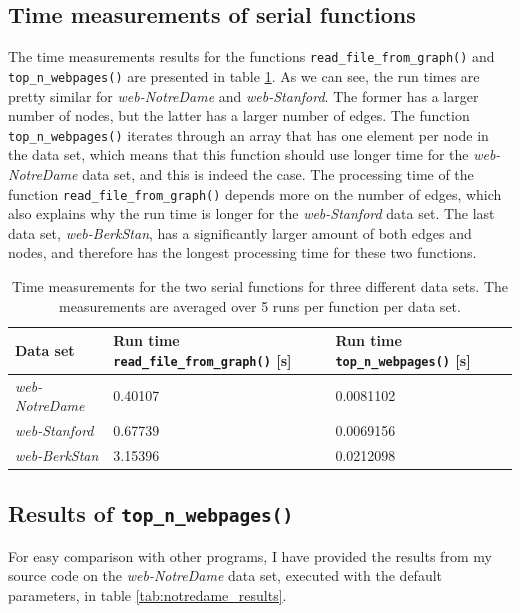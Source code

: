 \documentclass[10pt, a4paper]{amsart}
\numberwithin{figure}{section}
\numberwithin{table}{section}
\begin{document}
\subsection{Time measurements of serial functions}
The time measurements results for the functions \texttt{read\_file\_from\_graph()} and \texttt{top\_n\_webpages()} are presented in table \ref{tab:timing_serial}. As we can see, the run times are pretty similar for \textit{web-NotreDame} and \textit{web-Stanford}. The former has a larger number of nodes, but the latter has a larger number of edges. The function \texttt{top\_n\_webpages()} iterates through an array that has one element per node in the data set, which means that this function should use longer time for the \textit{web-NotreDame} data set, and this is indeed the case. The processing time of the function \texttt{read\_file\_from\_graph()} depends more on the number of edges, which also explains why the run time is longer for the \textit{web-Stanford} data set. The last data set, \textit{web-BerkStan}, has a significantly larger amount of both edges and nodes, and therefore has the longest processing time for these two functions.

\begin{table}[H]
    \caption{Time measurements for the two serial functions for three different data sets. The measurements are averaged over 5 runs per function per data set.}
    \label{tab:timing_serial}
    \begin{tabular}{lll}
        Data set & Run time \texttt{read\_file\_from\_graph()} [s] & Run time \texttt{top\_n\_webpages()} [s] \\
        \hline
        \textit{web-NotreDame} & 0.40107 & 0.0081102 \\
        \textit{web-Stanford} & 0.67739 & 0.0069156\\
        \textit{web-BerkStan} & 3.15396 & 0.0212098\\
    \end{tabular}
\end{table}


\subsection{Results of \texttt{top\_n\_webpages()}}

For easy comparison with other programs, I have provided the results from my source code on the \textit{web-NotreDame} data set, executed with the default parameters, in table \ref{tab:notredame_results}.
\end{document}
